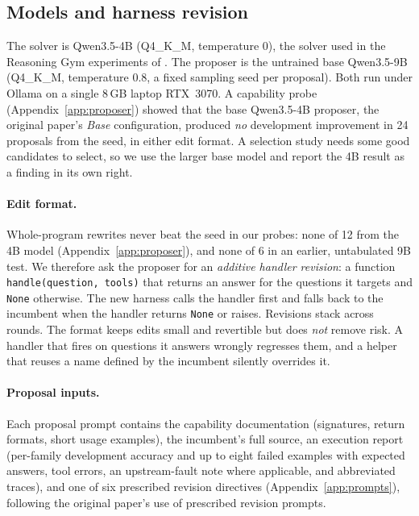 \subsection{Models and harness revision}
The solver is Qwen3.5-4B (Q4\_K\_M, temperature 0), the solver used in the Reasoning Gym experiments of
\citet{zhang2026harnesslearning}. The proposer is the untrained base Qwen3.5-9B (Q4\_K\_M, temperature
0.8, a fixed sampling seed per proposal). Both run under Ollama on a single 8\,GB laptop RTX~3070.
A capability probe (Appendix~\ref{app:proposer}) showed that the base Qwen3.5-4B proposer, the
original paper's \emph{Base} configuration, produced \emph{no} development improvement in 24
proposals from the seed, in either edit format. A selection study needs some good candidates to select,
so we use the larger base model and report the 4B result as a finding in its own right.

\paragraph{Edit format.} Whole-program rewrites never beat the seed in our probes: none of 12 from the 4B model
(Appendix~\ref{app:proposer}), and none of 6 in an earlier, untabulated 9B test.
We therefore ask the proposer for an \emph{additive handler revision}: a function
\texttt{handle(question, tools)} that returns an answer for the questions it targets and \texttt{None}
otherwise. The new harness calls the handler first and falls back to the incumbent when the handler
returns \texttt{None} or raises. Revisions stack across rounds. The format keeps edits small and
revertible but does \emph{not} remove risk. A handler that fires on questions it answers wrongly
regresses them, and a helper that reuses a name defined by the incumbent silently overrides it.

\paragraph{Proposal inputs.} Each proposal prompt contains the capability documentation (signatures,
return formats, short usage examples), the incumbent's full source, an execution report (per-family
development accuracy and up to eight failed examples with expected answers, tool errors, an
upstream-fault note where applicable, and abbreviated traces), and one of six prescribed revision
directives (Appendix~\ref{app:prompts}), following the original paper's use of prescribed revision prompts.


